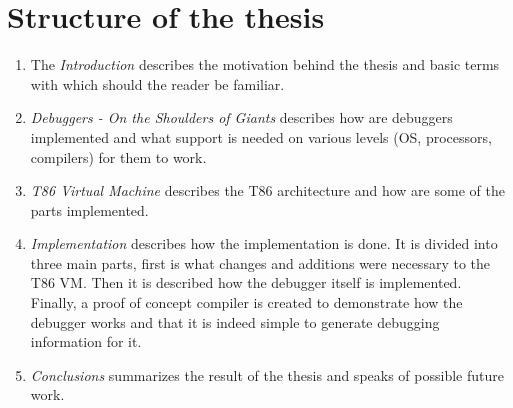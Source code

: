 \section{Structure of the thesis}
\begin{enumerate}
    \item The \textit{Introduction} describes the motivation behind the thesis and basic terms with which should the reader be familiar.
    \item \textit{Debuggers - On the Shoulders of Giants} describes how are debuggers implemented and what support is needed on various levels (OS, processors, compilers) for them to work.
    \item \textit{T86 Virtual Machine} describes the T86 architecture and how are some of the parts implemented.
    \item \textit{Implementation} describes how the implementation is done. It is divided into three main parts, first is what changes and additions were necessary to the T86 VM. Then it is described how the debugger itself is implemented. Finally, a proof of concept compiler is created to demonstrate how the debugger works and that it is indeed simple to generate debugging information for it.
    \item \textit{Conclusions} summarizes the result of the thesis and speaks of possible future work. 
\end{enumerate}

